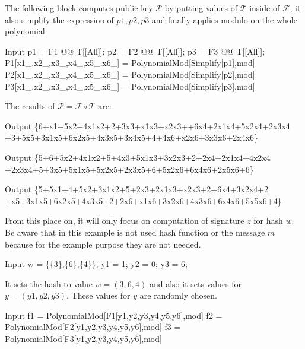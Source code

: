 \documentclass[thesis=M,english]{FITthesis}[2019/12/23]
\begin{document}
\noindent
The following block computes public key $\mathcal{P}$ by putting values of $\mathcal{T}$ inside of $\mathcal{F}$, it also simplify the expression of $p1,p2,p3$ and finally applies modulo on the whole polynomial:
\begin{mmaCell}[moredefined={p1, F1, T, p2, F2, p3, F3, P1, mod, P2, P3},morepattern={x1_, x2_, x3_, x4_, x5_, x6_}]{Input}
  p1 = F1 @@ T[[All]];
  p2 = F2 @@ T[[All]];
  p3 = F3 @@ T[[All]];
  P1[x1_,x2_,x3_,x4_,x5_,x6_] = PolynomialMod[Simplify[p1],mod]
  P2[x1_,x2_,x3_,x4_,x5_,x6_] = PolynomialMod[Simplify[p2],mod]
  P3[x1_,x2_,x3_,x4_,x5_,x6_] = PolynomialMod[Simplify[p3],mod]
\end{mmaCell}

\noindent
The results of $\mathcal{P} = \mathcal{F} \circ \mathcal{T}$ are:
\begin{mmaCell}[addtoindex=3]{Output}
  \{6+x1+5x2+4x1x2+2+3x3+x1x3+x2x3++6x4+2x1x4+5x2x4+2x3x4
+3+5x5+3x1x5+6x2x5+4x3x5+3x4x5+4+4x6+x2x6+3x3x6+2x4x6\}
\end{mmaCell}
\begin{mmaCell}{Output}
  \{5+6+5x2+4x1x2+5+4x3+5x1x3+3x2x3+2+2x4+2x1x4+4x2x4
+2x3x4+5+3x5+5x1x5+5x2x5+2x3x5+6+5x2x6+6x4x6+2x5x6+6\}
\end{mmaCell}
\begin{mmaCell}{Output}
  \{5+5x1+4+5x2+3x1x2+5+2x3+2x1x3+x2x3+2+6x4+3x2x4+2
+x5+3x1x5+6x2x5+4x3x5+2+2x6+x1x6+3x2x6+4x3x6+6x4x6+5x5x6+4\}
\end{mmaCell}
From this place on, it will only focus on computation of signature $z$ for hash $w$. Be aware that in this example is not used hash function or the message $m$ because for the example purpose they are not needed.
\begin{mmaCell}[moredefined={w, y1, y2, y3}]{Input}
  w  = \{\{3\},\{6\},\{4\}\};
  y1 = 1;
  y2 = 0;
  y3 = 6;
\end{mmaCell}
It sets the hash to value $w = (3,6,4)$ and also it sets values for $y = (y1,y2,y3)$. These values for $y$ are randomly chosen.
\begin{mmaCell}[addtoindex=3,moredefined={f1, F1, y1, y2, y3, mod, f2, F2, f3, F3}]{Input}
  f1 = PolynomialMod[F1[y1,y2,y3,y4,y5,y6],mod]
  f2 = PolynomialMod[F2[y1,y2,y3,y4,y5,y6],mod]
  f3 = PolynomialMod[F3[y1,y2,y3,y4,y5,y6],mod]
\end{mmaCell}
\end{document}
